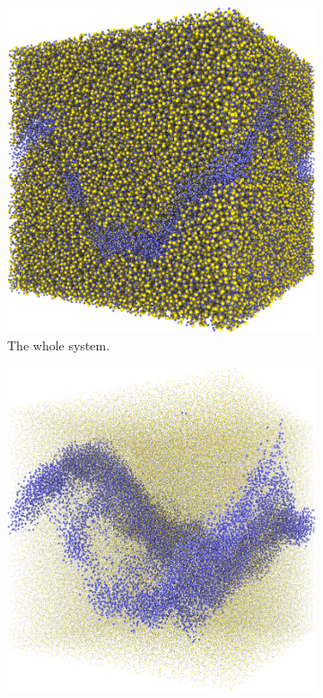 %
\begin{figure}[!p]%
    \centering%
    \setlength{\myfigwidth}{0.49\textwidth}%
%
    \begin{subfigure}[t]{\myfigwidth}%
        \centering%
        \includegraphics[width=\textwidth]{images/systems/trimmed-rough_fracture04_06}%
        \caption{The whole system.}%
    \end{subfigure}%
    \hfill%
    \begin{subfigure}[t]{\myfigwidth}%
        \centering%
        \includegraphics[width=\textwidth]{images/systems/trimmed-rough_fracture04_07}%

\end{subfigure}
\end{figure}
